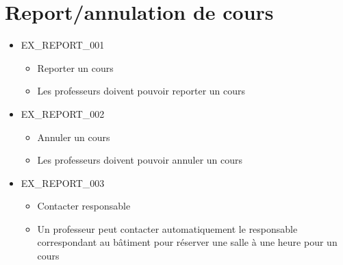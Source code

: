 \documentclass[french]{scrartcl}
\begin{document}
\section{Report/annulation de cours}
    \begin{itemize}
        \item EX\_REPORT\_001
        \begin{itemize}
            \item Reporter un cours
            \item Les professeurs doivent pouvoir reporter un cours
        \end{itemize}
        \item EX\_REPORT\_002
        \begin{itemize}
            \item Annuler un cours
            \item Les professeurs doivent pouvoir annuler un cours
        \end{itemize}
        \item EX\_REPORT\_003
        \begin{itemize}
            \item Contacter responsable
            \item Un professeur peut contacter automatiquement le responsable correspondant au bâtiment pour réserver une salle à une heure pour un cours
        \end{itemize}
    \end{itemize}
\end{document}
